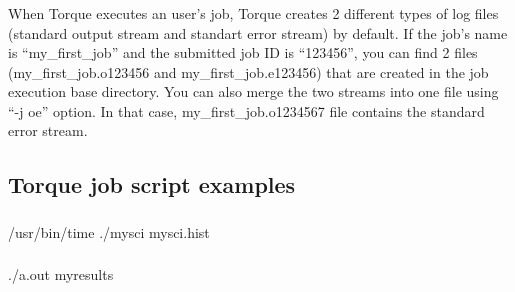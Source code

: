 \documentclass[letterpaper,10pt,english]{sphinxmanual}
\begin{document}
\subsubsection{}
\label{\detokenize{guide:job-log-files}}
When Torque executes an user’s job, Torque creates 2 different types of log files (standard output stream and standart error stream) by default. If the job’s name is “my\_first\_job” and the submitted job ID is “123456”, you can find 2 files (my\_first\_job.o123456 and my\_first\_job.e123456) that are created in the job execution base directory. You can also merge the two streams into one file using “-j oe” option. In that case, my\_first\_job.o1234567 file contains the standard error stream.

\begin{sphinxVerbatim}[commandchars=\\\{\}]
\end{sphinxVerbatim}


\subsection{Torque job script examples}
\label{\detokenize{guide:torque-job-script-examples}}

\subsubsection{}
\label{\detokenize{guide:simple-sequential-job}}
\begin{sphinxVerbatim}[commandchars=\\\{\}]

 
/usr/bin/time ./mysci \PYGZgt{} mysci.hist
\end{sphinxVerbatim}


\subsubsection{}
\label{\detokenize{guide:serial-job-with-openmp-multithreading}}
\begin{sphinxVerbatim}[commandchars=\\\{\}]

 
 
./a.out \PYGZgt{} my\PYGZus{}results
\end{sphinxVerbatim}
\end{document}
